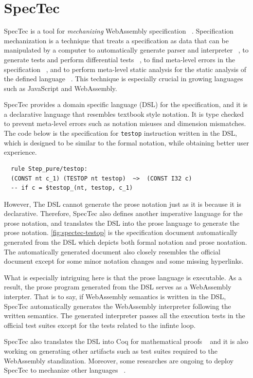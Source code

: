 \section{SpecTec}
\label{sec:spectec}


SpecTec is a tool for \textit{mechanizing} WebAssembly specification
~\cite{spectec}.
Specification mechanization is a technique that treats a specification as data
that can be manipulated by a computer to automatically generate parser and
interpreter ~\cite{jiset}, to generate tests and perform differential tests
~\cite{jest}, to find meta-level errors in the specification ~\cite{jstar}, and
to perform meta-level static analysis for the static analysis of the defined
language ~\cite{jsaver}.
This technique is especially crucial in growing languages such as JavaScript
and WebAssembly.


SpecTec provides a domain specific language (DSL) for the specification, and it
is a declarative language that resembles textbook style notation.
It is type checked to prevent meta-level errors such as notation misuses and
dimension mismatches. The code below is the specification for \texttt{testop}
instruction written in the DSL, which is designed to be similar to the formal
notation, while obtaining better user experience. \\
\begin{verbatim}
  rule Step_pure/testop:
  (CONST nt c_1) (TESTOP nt testop)  ~>  (CONST I32 c)
  -- if c = $testop_(nt, testop, c_1)
\end{verbatim}


However, The DSL cannot generate the prose notation just as it is because it is
declarative.
Therefore, SpecTec also defines another imperative language for the prose
notation, and translates the DSL into the prose language to generate the prose
notation.
\cref{fig:spectec-testop} is the specification document automatically
generated from the DSL which depicts both formal notation and prose noatation.
The automatically generated document also closely resembles the official
document except for some minor notation changes and some missing hyperlinks.


What is especially intriguing here is that the prose language is executable.
As a result, the prose program generated from the DSL serves as a WebAssembly
interpter.
That is to say, if WebAssembly semantics is written in the DSL, SpecTec
automatically generates the WebAssembly interpreter following the written
semantics.
The generated interpreter passes all the execution tests in the official test
suites except for the tests related to the infinte loop.


SpecTec also translates the DSL into Coq for mathematical proofs ~\cite{il2coq}
and it is also working on generating other artifacts such as test suites
required to the WebAssembly standization.
Moreover, some researches are ongoing to deploy SpecTec to mechanize other
languages ~\cite{p4-cherry-workshop}.
